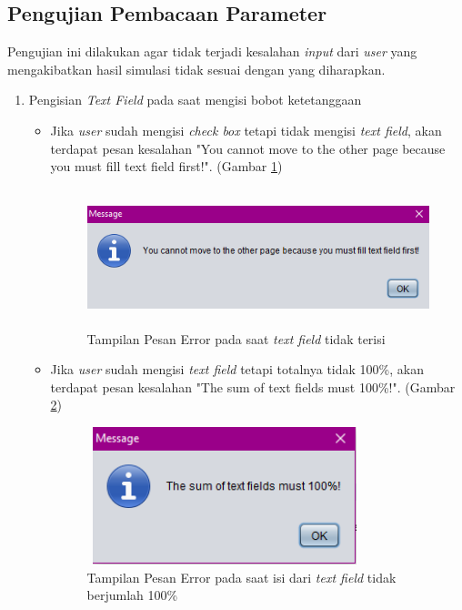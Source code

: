 \subsection{Pengujian Pembacaan Parameter}
Pengujian ini dilakukan agar tidak terjadi kesalahan \textit{input} dari \textit{user} yang mengakibatkan hasil simulasi tidak sesuai dengan yang diharapkan.
\begin{enumerate}
	\item Pengisian \textit{Text Field} pada saat mengisi bobot ketetanggaan\\
	\begin{itemize}
		\item Jika \textit{user} sudah mengisi \textit{check box} tetapi tidak mengisi \textit{text field}, akan terdapat pesan kesalahan "You cannot move to the other page because you must fill text field first!". (Gambar \ref{pesanError1})
		
	\begin{figure} [H]
	\centering  
	\includegraphics[width=12cm, height=4cm]{pesanError2} 
		\caption[Tampilan Pesan Error pada saat \textit{text field} tidak terisi]{Tampilan Pesan Error pada saat \textit{text field} tidak terisi}
	\label{pesanError1} 
\end{figure}
		
		\item Jika \textit{user} sudah mengisi \textit{text field} tetapi totalnya tidak 100\%, akan terdapat pesan kesalahan "The sum of text fields must 100\%!". (Gambar \ref{pesanError2})
		
	\begin{figure} [H]
	\centering  
	\includegraphics[width=8cm, height=4cm]{pesanError1} 
		\caption[Tampilan Pesan Error pada saat isi dari \textit{text field} tidak berjumlah 100\%]{Tampilan Pesan Error pada saat isi dari \textit{text field} tidak berjumlah 100\%}
	\label{pesanError2} 
\end{figure}


\end{itemize}
\end{enumerate}
